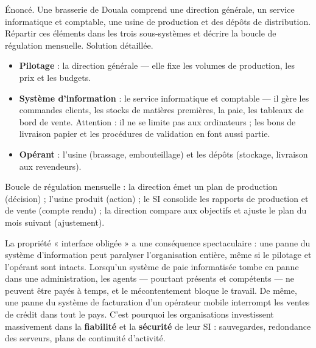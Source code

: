 \documentclass[11pt]{article}
\begin{document}
\begin{exoresolu}
Énoncé. Une brasserie de Douala comprend une direction générale, un service informatique et comptable, une usine de production et des dépôts de distribution. Répartir ces éléments dans les trois sous-systèmes et décrire la boucle de régulation mensuelle.
\tcblower
Solution détaillée.
\begin{itemize}
  \item \textbf{Pilotage} : la direction générale — elle fixe les volumes de production, les prix et les budgets.
  \item \textbf{Système d'information} : le service informatique et comptable — il gère les commandes clients, les stocks de matières premières, la paie, les tableaux de bord de vente. Attention : il ne se limite pas aux ordinateurs ; les bons de livraison papier et les procédures de validation en font aussi partie.
  \item \textbf{Opérant} : l'usine (brassage, embouteillage) et les dépôts (stockage, livraison aux revendeurs).
\end{itemize}
Boucle de régulation mensuelle : la direction émet un plan de production (décision) ; l'usine produit (action) ; le SI consolide les rapports de production et de vente (compte rendu) ; la direction compare aux objectifs et ajuste le plan du mois suivant (ajustement).
\end{exoresolu}

\begin{savaistu}
La propriété « interface obligée » a une conséquence spectaculaire : une panne du système d'information peut paralyser l'organisation entière, même si le pilotage et l'opérant sont intacts. Lorsqu'un système de paie informatisée tombe en panne dans une administration, les agents — pourtant présents et compétents — ne peuvent être payés à temps, et le mécontentement bloque le travail. De même, une panne du système de facturation d'un opérateur mobile interrompt les ventes de crédit dans tout le pays. C'est pourquoi les organisations investissent massivement dans la \textbf{fiabilité} et la \textbf{sécurité} de leur SI : sauvegardes, redondance des serveurs, plans de continuité d'activité.
\end{savaistu}
\end{document}
